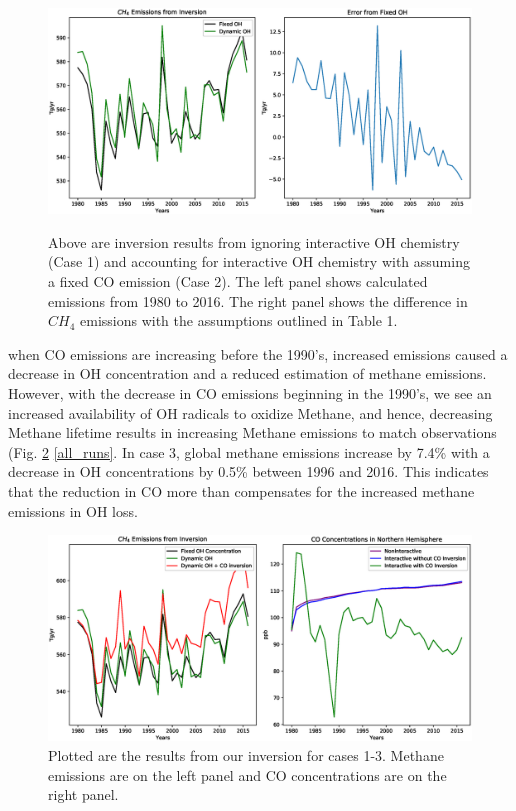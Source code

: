 \documentclass[two column,grl]{AGUTeX}
\begin{document}
\begin{article}
\begin{figure} \label{OH_bias}
\begin{center}
\includegraphics[width=\textwidth]{OH_variability_bias.eps} \\
\end{center}
\caption{ Above are inversion results from ignoring interactive OH chemistry (Case 1) and accounting for interactive OH chemistry with assuming a fixed CO emission (Case 2). The left panel shows calculated emissions from 1980 to 2016. The right panel shows the difference in $CH_4$ emissions with the assumptions outlined in Table 1.}
\end{figure}

when CO emissions are increasing before the 1990’s, increased emissions caused a decrease in OH concentration and a reduced estimation of methane emissions. However, with the decrease in CO emissions beginning in the 1990’s, we see an increased availability of OH radicals to oxidize Methane, and hence, decreasing Methane lifetime results in increasing Methane emissions to match observations (Fig. \ref{CO_bias} \ref{all_runs}. In case 3, global methane emissions increase by 7.4\% with a decrease in OH concentrations by 0.5\% between 1996 and 2016. This indicates that the reduction in CO more than compensates for the increased methane emissions in OH loss. 

\begin{figure} \label{CO_bias}
\begin{center}
\includegraphics[width=\textwidth]{CO_bias.eps}
\end{center}
\caption{Plotted are the results from our inversion for cases 1-3. Methane emissions are on the left panel and CO concentrations are on the right panel.}
\end{figure}


\end{article}
\end{document}
